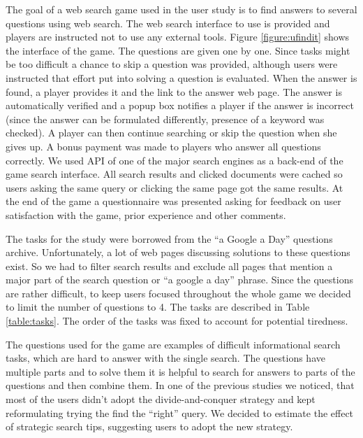 \documentclass{sig-alternate}
\begin{document}
The goal of a web search game used in the user study is to find answers to several questions using web search.
The web search interface to use is provided and players are instructed not to use any external tools.
Figure \ref{figure:ufindit} shows the interface of the game.
The questions are given one by one.
Since tasks might be too difficult a chance to skip a question was provided, although users were instructed that effort put into solving a question is evaluated.
When the answer is found, a player provides it and the link to the answer web page.
The answer is automatically verified and a popup box notifies a player if the answer is incorrect (since the answer can be formulated differently, presence of a keyword was checked).
A player can then continue searching or skip the question when she gives up.
A bonus payment was made to players who answer all questions correctly.
We used API of one of the major search engines as a back-end of the game search interface.
All search results and clicked documents were cached so users asking the same query or clicking the same page got the same results.
At the end of the game a questionnaire was presented asking for feedback on user satisfaction with the game, prior experience and other comments.

The tasks for the study were borrowed from the ``a Google a Day'' questions archive.
Unfortunately, a lot of web pages discussing solutions to these questions exist.
So we had to filter search results and exclude all pages that mention a major part of the search question or ``a google a day'' phrase.
Since the questions are rather difficult, to keep users focused throughout the whole game we decided to limit the number of questions to 4.
The tasks are described in Table \ref{table:tasks}.
The order of the tasks was fixed to account for potential tiredness.

The questions used for the game are examples of difficult informational search tasks, which are hard to answer with the single search.
The questions have multiple parts and to solve them it is helpful to search for answers to parts of the questions and then combine them.
In one of the previous studies we noticed, that most of the users didn't adopt the divide-and-conquer strategy and kept reformulating trying the find the ``right'' query.
We decided to estimate the effect of strategic search tips, suggesting users to adopt the new strategy.
\end{document}
